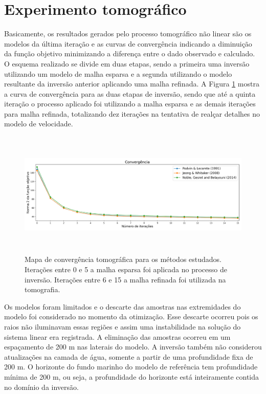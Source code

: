 \section{Experimento tomográfico}

Basicamente, os resultados gerados pelo processo tomográfico não linear são os modelos da última iteração e as curvas de convergência indicando a diminuição da função objetivo minimizando a diferença entre o dado observado e calculado. O esquema realizado se divide em duas etapas, sendo a primeira uma inversão utilizando um modelo de malha esparsa e a segunda utilizando o modelo resultante da inversão anterior aplicando uma malha refinada. A Figura \ref{fig:convergencia} mostra a curva de convergência para as duas etapas de inversão, sendo que até a quinta iteração o processo aplicado foi utilizando a malha esparsa e as demais iterações para malha refinada, totalizando dez iterações na tentativa de realçar detalhes no modelo de velocidade.   

\begin{figure}[H]
	\centering
	\includegraphics[width=16cm,height=6cm]{Imgs/Resultados/convergencia.png}
	\caption{Mapa de convergência tomográfica para os métodos estudados. Iterações entre 0 e 5 a malha esparsa foi aplicada no processo de inversão. Iterações entre 6 e 15 a malha refinada foi utilizada na tomografia.}
	\label{fig:convergencia}	
\end{figure}

Os modelos foram limitados e o descarte das amostras nas extremidades do modelo foi considerado no momento da otimização. Esse descarte ocorreu pois os raios não iluminavam essas regiões e assim uma instabilidade na solução do sistema linear era registrada. A eliminação das amostras ocorreu em um espaçamento de 200 m nas laterais do modelo. A inversão também não considerou atualizações na camada de água, somente a partir de uma profundidade fixa de 200 m. O horizonte do fundo marinho do modelo de referência tem profundidade mínima de 200 m, ou seja, a profundidade do horizonte está inteiramente contida no domínio da inversão.     

